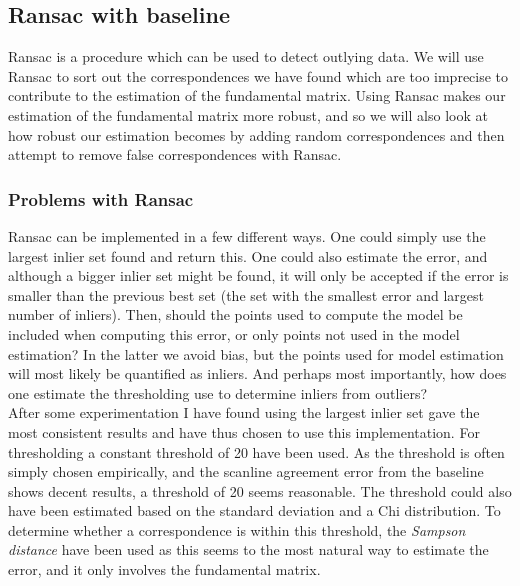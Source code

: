 \subsection{Ransac with baseline}
Ransac is a procedure which can be used to detect outlying data. We will use Ransac to sort out the correspondences we have found which are too imprecise to contribute to the estimation of the fundamental matrix. Using Ransac makes our estimation of the fundamental matrix more robust, and so we will also look at how robust our estimation becomes by adding random correspondences and then attempt to remove false correspondences with Ransac.

\subsubsection{Problems with Ransac}
Ransac can be implemented in a few different ways. One could simply use the largest inlier set found and return this. One could also estimate the error, and although a bigger inlier set might be found, it will only be accepted if the error is smaller than the previous best set (the set with the smallest error and largest number of inliers). Then, should the points used to compute the model be included when computing this error, or only points not used in the model estimation? In the latter we avoid bias, but the points used for model estimation will most likely be quantified as inliers. And perhaps most importantly, how does one estimate the thresholding use to determine inliers from outliers?\\
After some experimentation I have found using the largest inlier set gave the most consistent results and have thus chosen to use this implementation. For thresholding a constant threshold of 20 have been used. As the threshold is often simply chosen empirically, and the scanline agreement error from the baseline shows decent results, a threshold of 20 seems reasonable. The threshold could also have been estimated based on the standard deviation and a Chi distribution. To determine whether a correspondence is within this threshold, the \textit{Sampson distance} have been used as this seems to the most natural way to estimate the error, and it only involves the fundamental matrix.

